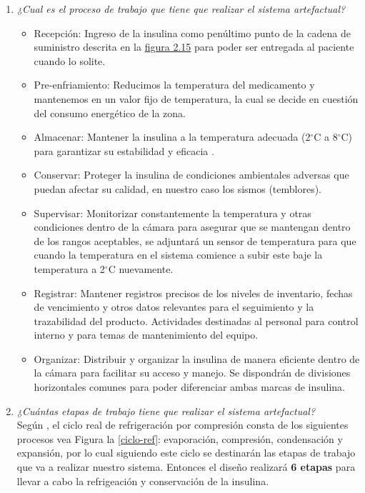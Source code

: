 \begin{enumerate}
		
	\item \textit{¿Cual es el proceso de trabajo que tiene que realizar el sistema artefactual?}
	\begin{itemize}
		\item Recepción: Ingreso de la insulina como penúltimo punto de la cadena de suministro descrita en la \hyperlink{figura-2-15}{figura 2.15} para poder ser entregada al paciente cuando lo solite. 
		\item Pre-enfriamiento: Reducimos la temperatura del medicamento y mantenemos en un valor fijo de temperatura, la cual se decide en cuestión del consumo energético de la zona.
		\item Almacenar: Mantener la insulina a la temperatura adecuada (2$^\circ$C a 8$^\circ$C) para garantizar su estabilidad y eficacia .
		\item Conservar: Proteger la insulina de condiciones ambientales adversas que puedan afectar su calidad, en nuestro caso los sismos (temblores).
		\item Supervisar: Monitorizar constantemente la temperatura y otras condiciones dentro de la cámara para asegurar que se mantengan dentro de los rangos aceptables, se adjuntará un sensor de temperatura para que cuando la temperatura en el sistema comience a subir este baje la temperatura a 2$^\circ$C nuevamente.
		\item Registrar: Mantener registros precisos de los niveles de inventario, fechas de vencimiento y otros datos relevantes para el seguimiento y la trazabilidad del producto. Actividades destinadas al personal para control interno y para temas de mantenimiento del equipo.
		\item Organizar: Distribuir y organizar la insulina de manera eficiente dentro de la cámara para facilitar su acceso y manejo. Se dispondrán de divisiones horizontales comunes para poder diferenciar ambas marcas de insulina. 
	\end{itemize}		
	\item \textit{¿Cuántas etapas de trabajo tiene que realizar el sistema artefactual?}\\
	Según \citeauthor{cengel-2009}\citeyear{cengel-2009},  el ciclo real de refrigeración por compresión consta de los siguientes procesos vea Figura la \ref{ciclo-ref}: evaporación, compresión, condensación y expansión, por lo cual siguiendo este ciclo se destinarán las etapas de trabajo que va a realizar nuestro sistema. Entonces el diseño realizará \textbf{6 etapas} para llevar a cabo la refrigeación y conservación de la insulina.
	

\end{enumerate}
